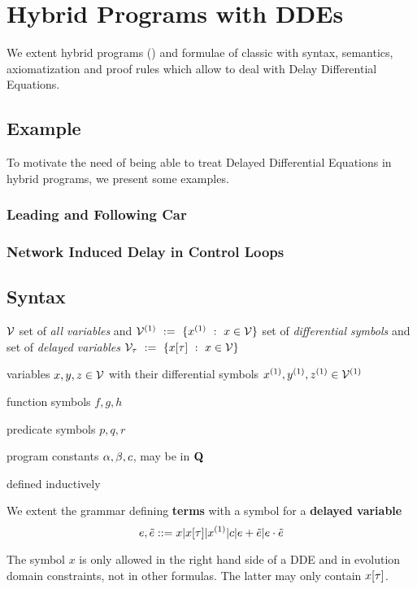 \chapter{Hybrid Programs with DDEs}\label{hybrid-programs-with-ddes}

We extent hybrid programs (\HPs) and formulae of classic \dL with syntax, semantics, axiomatization and proof rules which allow to deal with Delay Differential Equations.

\section{Example}
    \label{example-hp-cars}
    To motivate the need of being able to treat Delayed Differential Equations in hybrid programs, we present some examples.

    \subsection{Leading and Following Car}

    \subsection{Network Induced Delay in Control Loops}

\section{Syntax}
    \label{sec:syntax}

    $\mathcal{V}$ set of \textit{all variables} and $\diffvars\defeq\{\D{x} \with x\in\allvars\}$ set of \textit{differential symbols} and set of \textit{delayed variables} $\mathcal{V}_\tau~\mathrel{\mathop{:}}=~\{x[\tau] ~\mathrel{\mathop{:}}~ x\in\mathcal{V}\}$

    variables $x,y,z\in\mathcal{V}$ with their differential symbols $\D{x},\D{y},\D{z}\in\D{\allvars}$

    function symbols $f,g,h$

    predicate symbols $p,q,r$

    program constants $\alpha, \beta, c$, may be in $\mathbf{Q}$

    defined inductively

    \begin{definition}[Terms]
        \label{def:syntax-terms}

        We extent the grammar defining \textbf{terms} with a symbol for a \textbf{delayed variable}
        \begin{equation}
            \astrm,\bstrm ::= x|\xtau|\D{x}|c|\astrm+\bstrm|\astrm\cdot\bstrm
        \end{equation}


        The symbol $x$ is only allowed in the right hand side of a DDE and in evolution domain constraints, not in other formulas. The latter may only contain $x[\tau]$.

    \end{definition}


